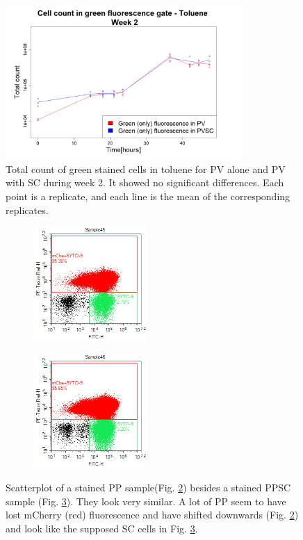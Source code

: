 \documentclass[a4paper, 10pt, conference]{ieeeconf}   %
\begin{document}
\begin{figure}
		\centering
		\includegraphics[width=9cm]{problemw2.PNG}
		\caption{Total count of green stained cells in toluene for PV alone and PV with SC during week 2. It showed no significant differences. Each point is a replicate, and each line is the mean of the corresponding replicates.}
		\label{problemw2}

  
\end{figure}

\begin{figure}
	\hspace{-0.3cm}
	\begin{subfigure}{.25\textwidth}
		\centering
		\includegraphics[width=4.3cm]{PP3T5.png}
		\caption{}
		\label{problemflow1}
	\end{subfigure}%
	\begin{subfigure}{.22\textwidth}
		\centering		
		\includegraphics[width=4.3cm]{PPSC1T5.png}
		\caption{}
		\label{problemflow2}				
	\end{subfigure}
	\caption{Scatterplot of a stained PP sample(Fig. \ref{problemflow1}) besides a stained PPSC sample (Fig. \ref{problemflow2}). They look very similar. A lot of PP seem to have lost mCherry (red) fluorescence and have shifted downwards (Fig. \ref{problemflow1}) and look like the supposed SC cells in Fig. \ref{problemflow2}.  }
	\label{problemflow}
\end{figure}	
\end{document}
